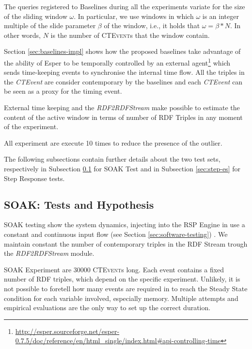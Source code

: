 The queries registered to \name Baselines during all the experiments variate for the size of the sliding window $\omega$. In particular, we use windows in which $\omega$ is an integer multiple of the slide parameter $\beta$ of the window, i.e., it holds that $\omega = \beta * N$. In other words, $N$ is the number of \textsc{CTEvent}s that the window contain. 

Section \ref{sec:baselines-impl} shows how the proposed baselines take advantage of the ability of Esper to be temporally controlled by an external agent\footnote{\url{http://esper.sourceforge.net/esper-0.7.5/doc/reference/en/html_single/index.html#api-controlling-time}} which sends time-keeping events to synchronise the internal time flow. All the triples in the \textit{CTEvent} are consider contemporary by the baselines and each \textit{CTEvent} can be seen as a proxy for the timing event. 

External time keeping and the \textit{RDF2RDFStream} make possible to estimate the content of the active window in terms of number of RDF Triples in any moment of the experiment.

All experiment are execute 10 times to reduce the presence of the outlier.

The following subsections contain further details about the two test sets, respectively in Subsection \ref{sec:soak-es} for SOAK Test and in Subsection \ref{sec:step-es} for Step Response tests.

\subsection{SOAK: Tests and Hypothesis}\label{sec:soak-es}

SOAK testing show the system dynamics, injecting into the RSP Engine in use a constant and continuous input flow (see Section \ref{sec:software-testing}) . We maintain constant the number of contemporary triples in the RDF Stream trough the \textit{RDF2RDFStream} module. %

SOAK Experiment are 30000 \textsc{CTEvent}s long. Each event contains a fixed number of RDF triples, which depend on the specific experiment. Unlikely, it is not possible to foretell how many events are required in to reach the Steady State condition for each variable involved, especially memory. Multiple attempts and empirical evaluations are the only way to set up the correct duration.

